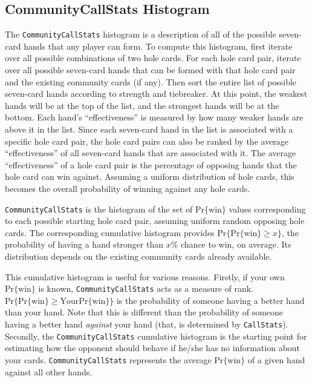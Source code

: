 \subsection{CommunityCallStats Histogram}
\label{sec:CommunityCallStats}

The \texttt{CommunityCallStats} histogram is a description of all of the possible seven-card hands that any player can form.
To compute this histogram, first iterate over all possible combinations of two hole cards.
For each hole card pair, iterate over all possible seven-card hands that can be formed with that hole card pair and the existing community cards (if any).
Then sort the entire list of possible seven-card hands according to strength and tiebreaker.
At this point, the weakest hands will be at the top of the list, and the strongest hands will be at the bottom.
Each hand's ``effectiveness'' is measured by how many weaker hands are above it in the list.
Since each seven-card hand in the list is associated with a specific hole card pair, the hole card pairs can also be ranked by the average ``effectiveness'' of all seven-card hands that are associated with it.
The average ``effectiveness'' of a hole card pair is the percentage of opposing hands that the hole card can win against.
Assuming a uniform distribution of hole cards, this becomes the overall probability of winning against any hole cards.

\texttt{CommunityCallStats} is the histogram of the set of $\mathrm{Pr\{win\}}$ values corresponding to each possible starting hole card pair, assuming uniform random opposing hole cards.
The corresponding cumulative histogram provides $\mathrm{Pr}\{\mathrm{Pr\{win\}} \ge x\}$, the probability of having a hand stronger than $x$\% chance to win, on average.
Its distribution depends on the existing community cards already available.

This cumulative histogram is useful for various reasons.
Firstly, if your own $\mathrm{Pr\{win\}}$ is known, \texttt{CommunityCallStats} acts as a measure of rank.
$\mathrm{Pr}\{\mathrm{Pr\{win\}} \ge \mathrm{Your Pr\{win\}}\}$ is the probability of someone having a better hand than your hand.
Note that this is different than the probability of someone having a better hand \emph{against} your hand (that, is determined by \texttt{CallStats}).
Secondly, the \texttt{CommunityCallStats} cumulative histogram is the starting point for estimating how the opponent should behave if he/she has no information about your cards.
\texttt{CommunityCallStats} represents the average $\mathrm{Pr\{win\}}$ of a given hand against all other hands.


